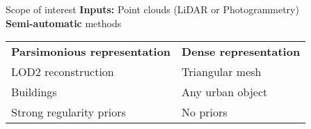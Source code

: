 \begin{frame}{Scope of interest}
	\textbf{Inputs:} Point clouds (LiDAR or Photogrammetry) \\
	\textbf{Semi-automatic} methods \\
	\pause
	
	\vspace{0.5cm}
	
	\begin{tabular}{ll}
		\textbf{Parsimonious representation} & \textbf{Dense representation} \\
		LOD2 reconstruction & Triangular mesh \\
		Buildings & Any urban object \\
		Strong regularity priors & No priors \\
	\end{tabular}
\end{frame}